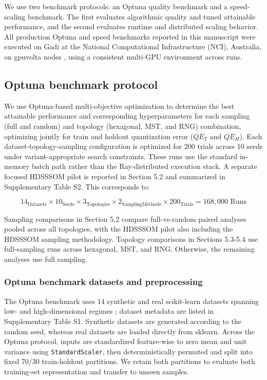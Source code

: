 \documentclass[10pt]{article} %
\begin{document}
We use two benchmark protocols: an Optuna quality benchmark and a speed-scaling benchmark. The first evaluates algorithmic quality and tuned attainable performance, and the second evaluates runtime and distributed scaling behavior. All production Optuna and speed benchmarks reported in this manuscript were executed on Gadi at the National Computational Infrastructure (NCI), Australia, on gpuvolta nodes \citep{HPCSystemsNCI}, using a consistent multi-GPU environment across runs.

\subsection{Optuna benchmark protocol}

We use Optuna-based multi-objective optimization to determine the best attainable performance and corresponding hyperparameters for each sampling (full and random) and topology (hexagonal, MST, and RNG) combination, optimizing jointly for train and holdout quantization error ($QE_T$ and $QE_H$). Each dataset-topology-sampling configuration is optimized for 200 trials across 10 seeds under variant-appropriate search constraints. These runs use the standard in-memory batch path rather than the Ray-distributed execution stack. A separate focused HDSSSOM pilot is reported in Section 5.2 and summarized in Supplementary Table S2. This corresponds to:

\begin{equation*}
14_{\text{Datasets}} \times 10_{\text{Seeds}} \times 3_{\text{Topologies}} \times 2_{\text{SamplingMethods}} \times 200_{\text{Trials}}= 168{,}000 \text{ Runs}
\end{equation*}

Sampling comparisons in Section 5.2 compare full-vs-random paired analyses pooled across all topologies, with the HDSSSOM pilot also including the HDSSSOM sampling methodology. Topology comparisons in Sections 5.3-5.4 use full-sampling runs across hexagonal, MST, and RNG. Otherwise, the remaining analyses use full sampling.

\subsubsection{Optuna benchmark datasets and preprocessing}

The Optuna benchmark uses 14 synthetic and real scikit-learn datasets spanning low- and high-dimensional regimes \citep{pedregosaScikitlearnMachineLearning2011}; dataset metadata are listed in Supplementary Table S1. Synthetic datasets are generated according to the random seed, whereas real datasets are loaded directly from sklearn. Across the Optuna protocol, inputs are standardized feature-wise to zero mean and unit variance using \texttt{StandardScaler}, then deterministically permuted and split into fixed 70/30 train-holdout partitions. We retain both partitions to evaluate both training-set representation and transfer to unseen samples.
\end{document}

